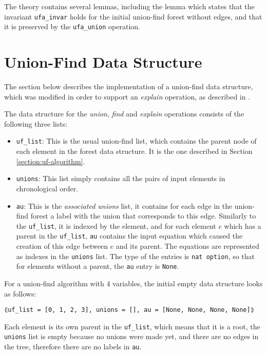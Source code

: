 The theory contains several lemmas, including the lemma which states that the invariant \lstinline{ufa_invar} holds for the initial union-find forest without edges, and that it is preserved by the \lstinline{ufa_union} operation.

\section{Union-Find Data Structure}
\label{section:uf-data}

The section below describes the implementation of a union-find data structure, which was modified in order to support an \emph{explain} operation, as described in \cite{Nieuwenhuis}.

The data structure for the \emph{union}, \emph{find} and \emph{explain} operations consists of the following three lists:

\begin{itemize}
	\item \lstinline{uf_list}: This is the usual union-find list, which contains the parent node of each element in the forest data structure. It is the one described in Section \ref{section:uf-algorithm}.

	\item \lstinline{unions}: This list simply contains all the pairs of input elements in chronological order.

	\item \lstinline{au}: This is the \emph{associated unions} list, it contains for each edge in the union-find forest a label with the union that corresponds to this edge. Similarly to the \lstinline{uf_list}, it is indexed by the element, and for each element $e$ which has a parent in the \lstinline{uf_list}, \lstinline{au} contains the input equation which caused the creation of this edge between $e$ and its parent. The equations are represented as indexes in the \lstinline{unions} list. The type of the entries is \lstinline{nat option}, so that for elements without a parent, the \lstinline{au} entry is \lstinline{None}.
\end{itemize}

\begin{exmp}\label{empty_ufe}
For a union-find algorithm with 4 variables, the initial empty data structure looks as follows:
\begin{lstlisting}
⦇uf_list = [0, 1, 2, 3], unions = [], au = [None, None, None, None]⦈
\end{lstlisting}
Each element is its own parent in the \lstinline{uf_list}, which means that it is a root, the \lstinline{unions} list is empty because no unions were made yet, and there are no edges in the tree, therefore there are no labels in \lstinline{au}.
\end{exmp}

